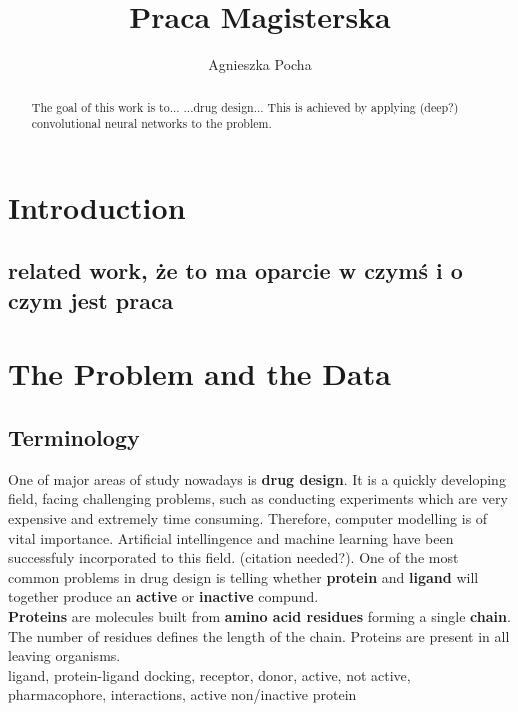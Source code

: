 \documentclass[a4paper,10pt]{report}
\title{Praca Magisterska}
\author{Agnieszka Pocha}
\begin{document}
  \maketitle
  \begin{abstract}
    The goal of this work is to... ...drug design... This is achieved by applying (deep?) convolutional neural networks to the problem.
  \end{abstract}
  \tableofcontents
  
  
  \chapter{Introduction} %
    \section{related work, że to ma oparcie w czymś i o czym jest praca}
  
  \chapter{The Problem and the Data}
    
    \section{Terminology} %
    One of major areas of study nowadays is \textbf{drug design}. It is a quickly developing field, facing challenging problems, such as conducting experiments which are very expensive and extremely time consuming. Therefore, computer modelling is of vital importance. Artificial intellingence and machine learning have been successfuly incorporated to this field. (citation needed?). One of the most common problems in drug design is telling whether \textbf{protein} and \textbf{ligand} will together produce an \textbf{active} or \textbf{inactive} compund.\\
    
    \textbf{Proteins} are molecules built from \textbf{amino acid residues} forming a single \textbf{chain}. The number of residues defines the length of the chain. Proteins are present in all leaving organisms.\\
    
    ligand, protein-ligand docking, receptor, donor, active, not active, pharmacophore, interactions, active non/inactive protein\\ %
\end{document}
